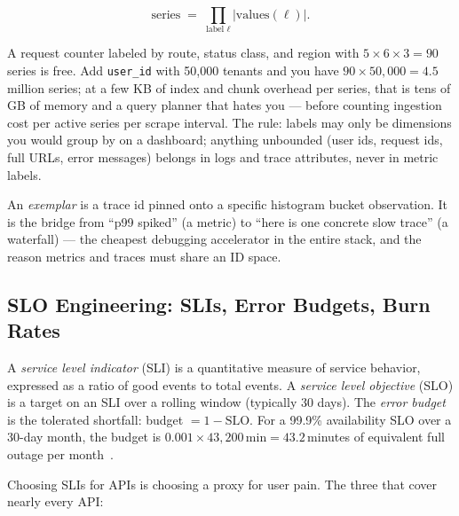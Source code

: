 \begin{equation}
\text{series} \;=\; \prod_{\text{label } \ell} |\text{values}(\ell)| .
\label{eq:ch18-cardinality}
\end{equation}

A request counter labeled by route, status class, and region with
$5 \times 6 \times 3 = 90$ series is free. Add \texttt{user\_id} with
50{,}000 tenants and you have $90 \times 50{,}000 = 4.5$ million series;
at a few KB of index and chunk overhead per series, that is tens of GB of
memory and a query planner that hates you --- before counting ingestion
cost per active series per scrape interval. The rule: labels may only be
dimensions you would group by on a dashboard; anything unbounded
(user ids, request ids, full URLs, error messages) belongs in logs and
trace attributes, never in metric labels.

\begin{definition}[Exemplar]
An \emph{exemplar} is a trace id pinned onto a specific histogram bucket
observation. It is the bridge from ``p99 spiked'' (a metric) to ``here is
one concrete slow trace'' (a waterfall) --- the cheapest debugging
accelerator in the entire stack, and the reason metrics and traces must
share an ID space.
\end{definition}

\subsection{SLO Engineering: SLIs, Error Budgets, Burn Rates}
\label{subsec:ch18-slo}

\begin{definition}
A \emph{service level indicator} (SLI) is a quantitative measure of service
behavior, expressed as a ratio of good events to total events. A
\emph{service level objective} (SLO) is a target on an SLI over a rolling
window (typically 30 days). The \emph{error budget} is the tolerated
shortfall: budget $= 1 - \text{SLO}$. For a 99.9\% availability SLO over a
30-day month, the budget is $0.001 \times 43{,}200\,\text{min} =
43.2$\,minutes of equivalent full outage per month~\cite{beyer2016sre}.
\end{definition}

Choosing SLIs for APIs is choosing a proxy for user pain. The three that
cover nearly every API:

